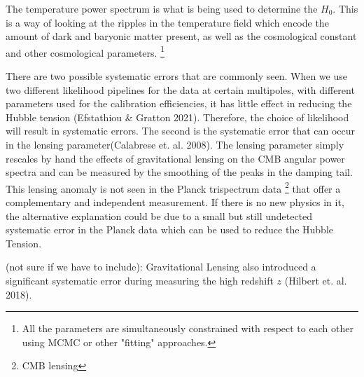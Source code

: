 The temperature power spectrum is what is being used to determine the $H_0$. This is a way of looking at the ripples in the temperature field which encode the amount of dark and baryonic matter present, as well as the cosmological constant and other cosmological parameters.
\footnote{All the parameters are simultaneously constrained with respect to each other using MCMC or other "fitting" approaches. }

There are two possible systematic errors that are commonly seen. When we use two different likelihood pipelines for the data at certain multipoles, with different parameters used for the calibration efficiencies, it has little effect in reducing the Hubble tension (Efstathiou $\&$ Gratton 2021)\cite{Efstathiou_2021}. Therefore, the choice of likelihood will result in systematic errors. 
The second is the systematic error that can occur in the lensing parameter(Calabrese et. al. 2008)\cite{Calabrese_2008}. The lensing parameter simply rescales by hand the effects of gravitational lensing on the CMB angular power spectra and can be measured by the smoothing of the peaks in the damping tail. This lensing anomaly is not seen in the Planck trispectrum data \footnote{CMB lensing} that offer a complementary and independent measurement. If there is no new physics in it, the alternative explanation could be due to a small but still undetected systematic error in the Planck data which can be used to reduce the Hubble Tension.

(not sure if we have to include):
Gravitational Lensing also introduced a significant systematic error during measuring the high redshift $z$ (Hilbert et. al. 2018). 
